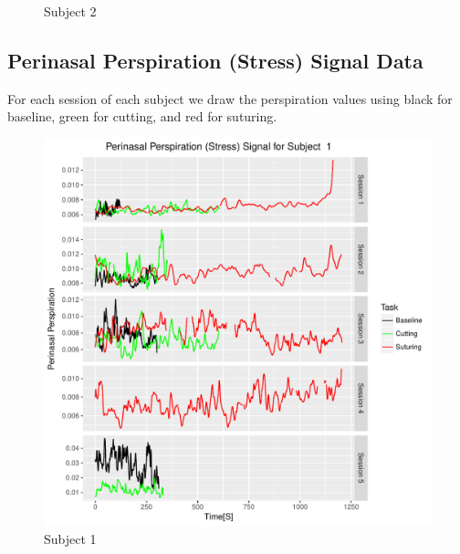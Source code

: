 \documentclass[12pt,epsf]{report}
\begin{document}
\begin{figure}[!htb]
\begin{minipage}[c]{0.5\linewidth}
	\caption{Subject 2}
	\end{minipage}
\end{figure}

\subsection*{Perinasal Perspiration (Stress) Signal Data}
For each session of each subject  we draw the perspiration values using black for baseline, green for cutting, and red for suturing. 
\begin{figure}[!htb]
	\begin{minipage}[c]{0.5\linewidth}
	\includegraphics[width=\linewidth]{s1pp.pdf}
	\caption{Subject 1 }
	\end{minipage}
	\hfill
	\begin{minipage}[c]{0.5\linewidth}

\end{minipage}
\end{figure}
\end{document}
